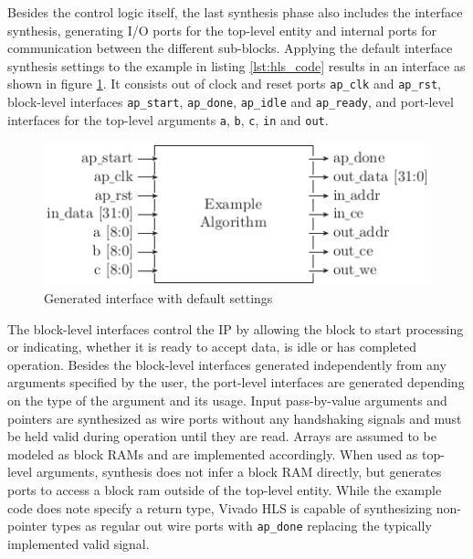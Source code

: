 Besides the control logic itself, the last synthesis phase also includes the
interface synthesis, generating I/O ports for the top-level entity and
internal ports for communication between the different sub-blocks. Applying
the default interface synthesis settings to the example in listing
\ref{lst:hls_code} results in an interface as shown in figure
\ref{fig:hls_if}. It consists out of clock and reset ports
\lstinline{ap_clk} and \lstinline{ap_rst}, block-level interfaces
\lstinline{ap_start}, \lstinline{ap_done}, \lstinline{ap_idle} and
\lstinline{ap_ready}, and port-level interfaces for the top-level arguments
\lstinline{a}, \lstinline{b}, \lstinline{c}, \lstinline{in} and
\lstinline{out}.
\begin{figure}[tb]
	\centering
	\includegraphics{../figures/hls_if}
	\caption{Generated interface with default settings}
	\label{fig:hls_if}
\end{figure}
The block-level interfaces control the \ac{IP} by allowing the block to start
processing or indicating, whether it is ready to accept data, is idle or has
completed operation. Besides the block-level interfaces generated
independently from any arguments specified by the user, the port-level
interfaces are generated depending on the type of the argument and its usage.
Input pass-by-value arguments and pointers are synthesized as wire ports
without any handshaking signals and must be held valid during operation until
they are read. Arrays are assumed to be modeled as block \acp{RAM} and are
implemented accordingly. When used as top-level arguments, synthesis does not
infer a block \ac{RAM} directly, but generates ports to access a block ram
outside of the top-level entity. While the example code does note specify a
return type, Vivado HLS is capable of synthesizing non-pointer types as
regular out wire ports with \lstinline{ap_done} replacing the typically
implemented valid signal.

